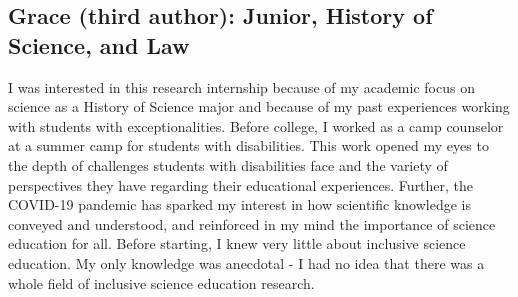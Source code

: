\documentclass[11.5pt]{sig-alternate}
\begin{document}
\begin{large}
\subsection*{Grace (third author): Junior, History of Science, and Law}

I was interested in this research internship because of my academic focus on science as a History of Science major and because of my past experiences working with students with exceptionalities. Before college, I worked as a camp counselor at a summer camp for students with disabilities. This work opened my eyes to the depth of challenges students with disabilities face and the variety of perspectives they have regarding their educational experiences. Further, the COVID-19 pandemic has sparked my interest in how scientific knowledge is conveyed and understood, and reinforced in my mind the importance of science education for all. Before starting, I knew very little about inclusive science education. My only knowledge was anecdotal - I had no idea that there was a whole field of inclusive science education research. 


\end{large}
\end{document}
